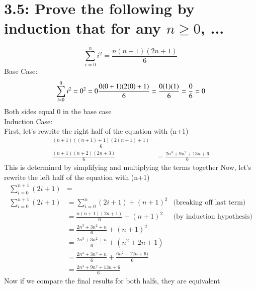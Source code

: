 \documentclass{article}
\begin{document}
\section*{3.5: Prove the following by induction that for any $n \geq 0$, ...}
\begin{equation}
  \sum_{i=0}^n i^2 = \frac{n(n+1)(2n+1)}{6}
\end{equation}
Base Case:
\begin{equation}
  \sum_{i=0}^0 i^2 = 0^2 = 0 \\
  \frac{0(0+1)(2(0)+1)}{6} = \frac{0(1)(1)}{6} = \frac{0}{6} = 0
\end{equation}
Both sides equal 0 in the base case\\
Induction Case: \\
First, let's rewrite the right half of the equation with (n+1)
\begin{align*}
  \frac{(n+1)((n+1)+1)(2(n+1)+1)}{6} &= \\
  \frac{(n+1)(n+2)(2n+3)}{6} &= \frac{2n^3+9n^2+13n+6}{6}
\end{align*}
This is determined by simplifying and multiplying the terms together
Now, let's rewrite the left half of the equation with (n+1)
\begin{align*}
  \sum_{i=0}^{n+1} (2i + 1) &= \\
  \sum_{i=0}^{n+1} (2i + 1) &= \sum_{i=0}^{n} (2i + 1) + (n+1)^2 &\textrm{(breaking off last term)} \\
  &= \frac{n(n+1)(2n+1)}{6} + (n+1)^2 &\textrm{(by induction hypothesis)} \\
  &= \frac{2n^3+3n^2+n}{6} + (n+1)^2 &\\
  &= \frac{2n^3+3n^2+n}{6} + (n^2+2n+1) &\\
  &= \frac{2n^3+3n^2+n}{6} + \frac{6n^2+12n+6)}{6} &\\
  &= \frac{2n^3+9n^2+13n+6}{6}
\end{align*}
Now if we compare the final results for both halfs, they are equivalent
\end{document}
